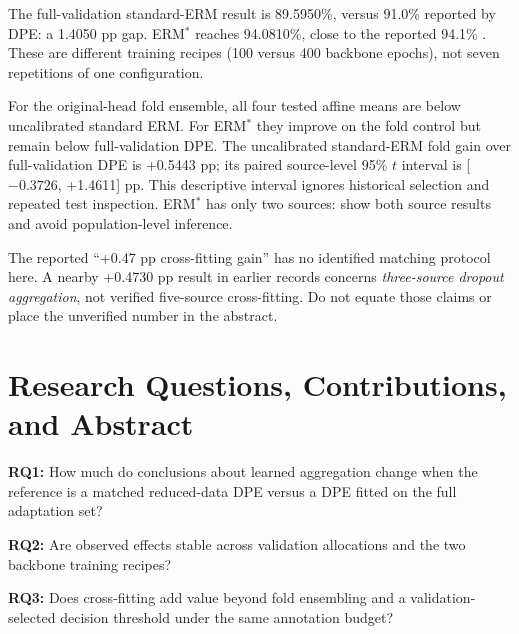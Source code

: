 \documentclass[runningheads]{llncs}
\begin{document}
The full-validation standard-ERM result is 89.5950\%, versus 91.0\% reported by DPE: a 1.4050 pp gap. ERM$^*$ reaches 94.0810\%, close to the reported 94.1\% \cite{dpe}. These are different training recipes (100 versus 400 backbone epochs), not seven repetitions of one configuration.

For the original-head fold ensemble, all four tested affine means are below uncalibrated standard ERM. For ERM$^*$ they improve on the fold control but remain below full-validation DPE. The uncalibrated standard-ERM fold gain over full-validation DPE is +0.5443 pp; its paired source-level 95\% $t$ interval is [$-0.3726$, +1.4611] pp. This descriptive interval ignores historical selection and repeated test inspection. ERM$^*$ has only two sources: show both source results and avoid population-level inference.

The reported ``+0.47 pp cross-fitting gain'' has no identified matching protocol here. A nearby +0.4730 pp result in earlier records concerns \emph{three-source dropout aggregation}, not verified five-source cross-fitting. Do not equate those claims or place the unverified number in the abstract.


\section{Research Questions, Contributions, and Abstract}
\textbf{RQ1:} How much do conclusions about learned aggregation change when the reference is a matched reduced-data DPE versus a DPE fitted on the full adaptation set?\par
\textbf{RQ2:} Are observed effects stable across validation allocations and the two backbone training recipes?\par
\textbf{RQ3:} Does cross-fitting add value beyond fold ensembling and a validation-selected decision threshold under the same annotation budget?
\end{document}
